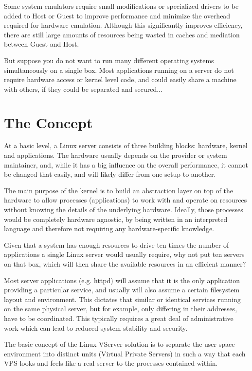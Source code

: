 Some system emulators require small modifications or specialized drivers to be
added to Host or Guest to improve performance and minimize the overhead
required for hardware emulation. Although this significantly improves
efficiency, there are still large amounts of resources being wasted in caches
and mediation between Guest and Host.

But suppose you do not want to run many different operating systems
simultaneously on a single box. Most applications running on a server do not
require hardware access or kernel level code, and could easily share a machine
with others, if they could be separated and secured...


\section{The Concept}
\label{sec:intro:vserver:concept}

At a basic level, a Linux server consists of three building blocks: hardware,
kernel and applications. The hardware usually depends on the provider or system
maintainer, and, while it has a big influence on the overall performance, it
cannot be changed that easily, and will likely differ from one setup to
another.

The main purpose of the kernel is to build an abstraction layer on top of the
hardware to allow processes (applications) to work with and operate on
resources without knowing the details of the underlying hardware. Ideally,
those processes would be completely hardware agnostic, by being written in an
interpreted language and therefore not requiring any hardware-specific
knowledge.

Given that a system has enough resources to drive ten times the number of
applications a single Linux server would usually require, why not put ten
servers on that box, which will then share the available resources in an
efficient manner?

Most server applications (e.g. httpd) will assume that it is the only
application providing a particular service, and usually will also assume a
certain filesystem layout and environment. This dictates that similar or
identical services running on the same physical server, but for example, only
differing in their addresses, have to be coordinated. This typically requires a
great deal of administrative work which can lead to reduced system stability
and security.

The basic concept of the Linux-VServer solution is to separate the user-space
environment into distinct units (Virtual Private Servers) in such a way that
each VPS looks and feels like a real server to the processes contained within.

